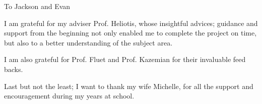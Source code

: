 \documentclass[12pt,american]{report}
\begin{document}
\vfill
\begin{center}
To Jackson and Evan
\end{center}
\vfill

%
I am grateful for my adviser Prof. Heliotis, whose insightful advices; guidance and support from the beginning not only enabled me to complete the project on time, but also to a better understanding of the subject area.

I am also grateful for Prof. Fluet and Prof. Kazemian for their invaluable feed backs.

Last but not the least; I want to thank my wife Michelle, for all the support and encouragement during my years at school.

\newcommand{\etc} {\emph{etc.\/}}
\newcommand{\etal}{\emph{et~al.\/}}
\newcommand{\eg}  {\emph{e.g.\/}}
\newcommand{\ie}  {\emph{i.e.\/}}






\afterpreface%
\end{document}
